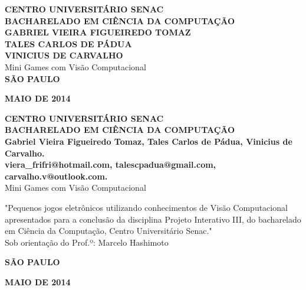 \documentclass[a4paper]{article}
\begin{document}
\begin{titlepage}
 \vfill
  \begin{center}
   {\large \textbf{CENTRO UNIVERSITÁRIO SENAC}} \\
   {\large \textbf{BACHARELADO EM CIÊNCIA DA COMPUTAÇÃO}} \\[4cm]
   
   {\large \textbf{GABRIEL VIEIRA FIGUEIREDO TOMAZ}}\\
   {\large \textbf{TALES CARLOS DE PÁDUA}}\\
   {\large \textbf{VINICIUS DE CARVALHO}}\\[4cm]


   {\Large Mini Games com Visão Computacional}\\[4cm]

\vspace{2cm}
\large \textbf{SÃO PAULO}

\large \textbf{MAIO DE 2014}
\end{center}
\end{titlepage}

\break

\begin{titlepage}
 \vfill
  \begin{center}
   {\large \textbf{CENTRO UNIVERSITÁRIO SENAC}} \\
   {\large \textbf{BACHARELADO EM CIÊNCIA DA COMPUTAÇÃO}} \\[4cm]

   {\large \textbf{Gabriel Vieira Figueiredo Tomaz, Tales Carlos de Pádua, Vinicius de Carvalho.}}\\ [1cm]
  
   {\large \textbf{viera\_frifri@hotmail.com, talescpadua@gmail.com, carvalho.v@outlook.com.}}\\ [3cm]
   
 
   {\Large Mini Games com Visão Computacional}\\[2cm]

   \hspace{.45\textwidth} 
   \begin{minipage}{.5\textwidth}
   \large "Pequenos jogos eletrônicos utilizando conhecimentos de Visão Computacional apresentados para a conclusão da disciplina Projeto Interativo III, do bacharelado em Ciência da Computação, Centro Universitário Senac."\\[0.5cm]
      Sob orientação do Prof.º: Marcelo Hashimoto
  \end{minipage}
  \vfill

\vspace{1cm}
\large \textbf{SÃO PAULO}

\large \textbf{MAIO DE 2014}
\end{center}
\end{titlepage}
\end{document}
